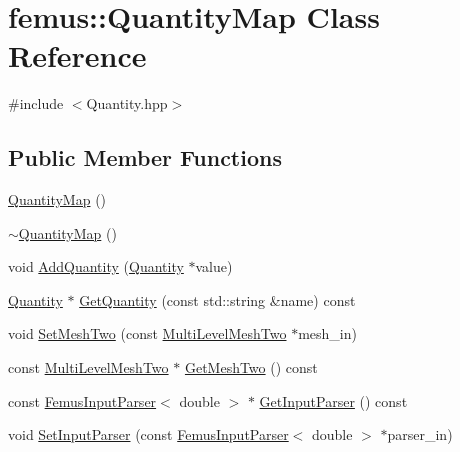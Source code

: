 \hypertarget{classfemus_1_1_quantity_map}{}\section{femus\+:\+:Quantity\+Map Class Reference}
\label{classfemus_1_1_quantity_map}


{\ttfamily \#include $<$Quantity.\+hpp$>$}

\subsection*{Public Member Functions}
\begin{DoxyCompactItemize}
\item 
\mbox{\hyperlink{classfemus_1_1_quantity_map_aa342e3de043474f9e70768e8b163493d}{Quantity\+Map}} ()
\item 
\mbox{\hyperlink{classfemus_1_1_quantity_map_a2cd0a6d4114e5be3e35aa6a0703853d8}{$\sim$\+Quantity\+Map}} ()
\item 
void \mbox{\hyperlink{classfemus_1_1_quantity_map_ad491f645bc7537f47462cc352f0add25}{Add\+Quantity}} (\mbox{\hyperlink{classfemus_1_1_quantity}{Quantity}} $\ast$value)
\item 
\mbox{\hyperlink{classfemus_1_1_quantity}{Quantity}} $\ast$ \mbox{\hyperlink{classfemus_1_1_quantity_map_a2510c3eff021fa6704888731f77b1a79}{Get\+Quantity}} (const std\+::string \&name) const
\item 
void \mbox{\hyperlink{classfemus_1_1_quantity_map_a5e91f9c899e60ee5249e57e0f746dc2c}{Set\+Mesh\+Two}} (const \mbox{\hyperlink{classfemus_1_1_multi_level_mesh_two}{Multi\+Level\+Mesh\+Two}} $\ast$mesh\+\_\+in)
\item 
const \mbox{\hyperlink{classfemus_1_1_multi_level_mesh_two}{Multi\+Level\+Mesh\+Two}} $\ast$ \mbox{\hyperlink{classfemus_1_1_quantity_map_a1fd0c792179b5eeb087874311cff6635}{Get\+Mesh\+Two}} () const
\item 
const \mbox{\hyperlink{classfemus_1_1_femus_input_parser}{Femus\+Input\+Parser}}$<$ double $>$ $\ast$ \mbox{\hyperlink{classfemus_1_1_quantity_map_ae45ce1f62fbaf4c7253231bfdfc2a699}{Get\+Input\+Parser}} () const
\item 
void \mbox{\hyperlink{classfemus_1_1_quantity_map_a607c4c523156d00c75864679d301aa05}{Set\+Input\+Parser}} (const \mbox{\hyperlink{classfemus_1_1_femus_input_parser}{Femus\+Input\+Parser}}$<$ double $>$ $\ast$parser\+\_\+in)
\end{DoxyCompactItemize}



